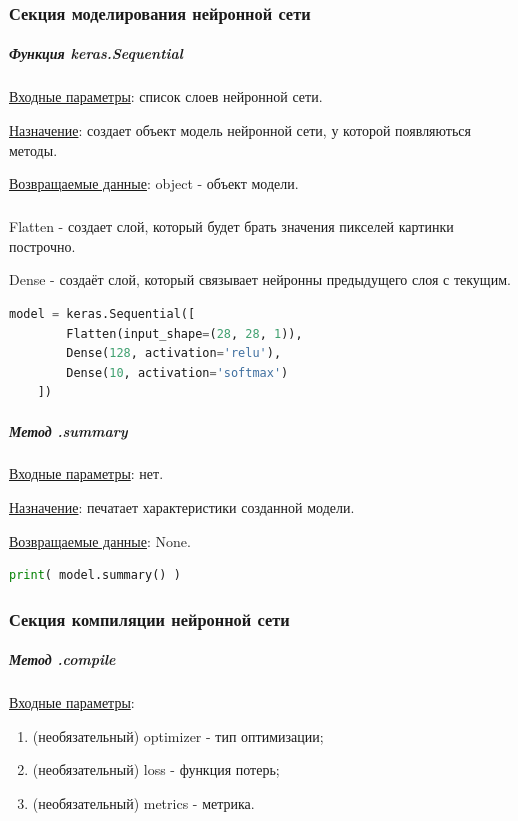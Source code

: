\subsubsection{Секция моделирования нейронной сети}


\subparagraph{Функция keras.Sequential} \hspace{0pt}

\underline{Входные параметры}: список слоев нейронной сети.

\underline{Назначение}: создает объект модель нейронной сети, у которой появляються методы.

\underline{Возвращаемые данные}: object - объект модели.

\subparagraph{} \hspace{0pt}

Flatten - создает слой, который будет брать значения пикселей картинки построчно.

Dense - создаёт слой, который связывает нейронны предыдущего слоя с текущим.

\begin{lstlisting}[language=Python,]
    model = keras.Sequential([
        Flatten(input_shape=(28, 28, 1)),
        Dense(128, activation='relu'),
        Dense(10, activation='softmax')
    ])
\end{lstlisting}

\subparagraph{Метод .summary} \hspace{0pt}

\underline{Входные параметры}: нет.

\underline{Назначение}: печатает характеристики созданной модели.

\underline{Возвращаемые данные}: None.


\begin{lstlisting}[language=Python,]
    print( model.summary() )
\end{lstlisting}



\subsubsection{Секция компиляции нейронной сети}

\subparagraph{Метод .compile} \hspace{0pt}

\underline{Входные параметры}:
\begin{enumerate}
    \item (необязательный) optimizer - тип оптимизации;
    \item (необязательный) loss - функция потерь;
    \item (необязательный) metrics - метрика.
\end{enumerate}

